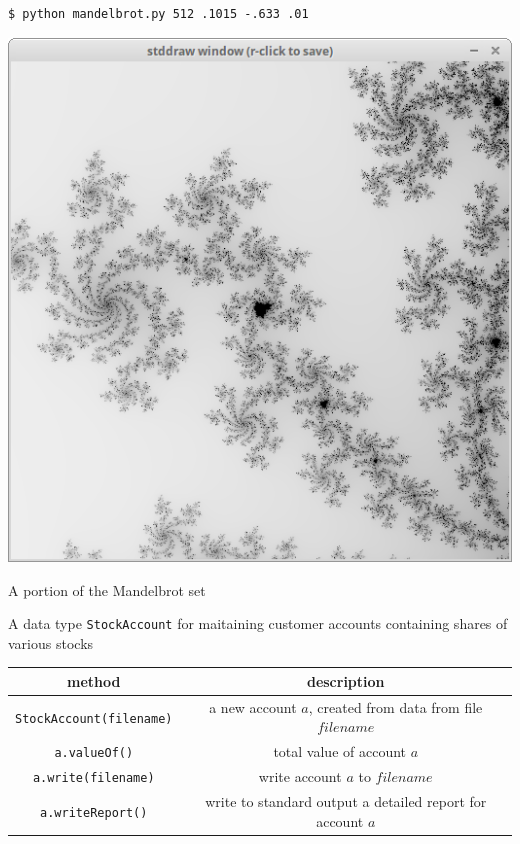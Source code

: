 \documentclass[8pt,a4paper,compress,handout]{beamer}
\begin{document}
\begin{frame}[fragile]
\begin{minipage}{200pt}
\begin{lstlisting}[language={}]
$ python mandelbrot.py 512 .1015 -.633 .01
\end{lstlisting}
\end{minipage}%
\hfill
\begin{minipage}{100pt}
\begin{center}
\includegraphics[scale=0.2]{figures/mandelbrot2.png}

\smallskip

\tiny A portion of the Mandelbrot set
\end{center}
\end{minipage}%
\end{frame}

\begin{frame}[fragile]
A data type \lstinline{StockAccount} for maitaining customer accounts containing shares of various stocks
\begin{center}
\begin{tabular}{cc}
method & description \\ \hline
\lstinline$StockAccount(filename)$ & a new account $a$, created from data from file $filename$ \\
\lstinline$a.valueOf()$ & total value of account $a$ \\
\lstinline$a.write(filename)$ & write account $a$ to $filename$ \\
\lstinline$a.writeReport()$ & write to standard output a detailed report for account $a$
\end{tabular} 
\end{center}
\end{frame}
\end{document}
